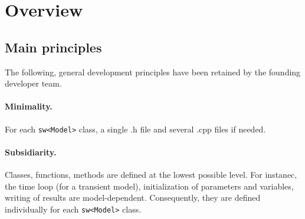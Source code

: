 \section{Overview}
\subsection{Main principles}\label{subsec_main_principles}
The following, general development principles have been retained by the founding developer team.
\paragraph*{Minimality.}
For each \texttt{sw<Model>} class, a single .h file and several .cpp files if needed.
\paragraph{Subsidiarity.}
Classes, functions, methods are defined at the lowest possible level. For instanec, the time loop (for a transient model), initialization of parameters and variables, writing of results are model-dependent. Consequently, they are defined individually for each \texttt{sw<Model>} class. 


